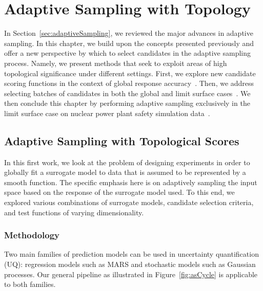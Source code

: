 
\chapter{Adaptive Sampling with Topology}
\label{ch:adaptiveSampling}

In Section~\ref{sec:adaptiveSampling}, we reviewed the major advances in adaptive sampling.
%
In this chapter, we build upon the concepts presented previously and offer a new perspective by which to select candidates in the adaptive sampling process.
%
Namely, we present methods that seek to exploit areas of high topological significance under different settings.
%
First, we explore new candidate scoring functions in the context of global response accuracy~\cite{MaljovecWangKupresanin2013}.
%
Then, we address selecting batches of candidates in both the global and limit surface cases~\cite{MaljovecWangMoeller2014}.
%
We then conclude this chapter by performing adaptive sampling exclusively in the limit surface case on nuclear power plant safety simulation data~\cite{MaljovecWangMandelli2013b}.

\section{Adaptive Sampling with Topological Scores}
\label{paper:ijuq2013}
In this first work, we look at the problem of designing experiments in order to globally fit a surrogate model to data that is assumed to be represented by a smooth function.
%
The specific emphasis here is on adaptively sampling the input space based on the response of the surrogate model used.
%
To this end, we explored various combinations of surrogate models, candidate selection criteria, and test functions of varying dimensionality.

\subsection{Methodology}

Two main families of prediction models can be used in uncertainty quantification (UQ): regression models such as MARS and stochastic models such as Gaussian processes.
%
Our general pipeline as illustrated in Figure~\ref{fig:asCycle} is applicable to both families.

